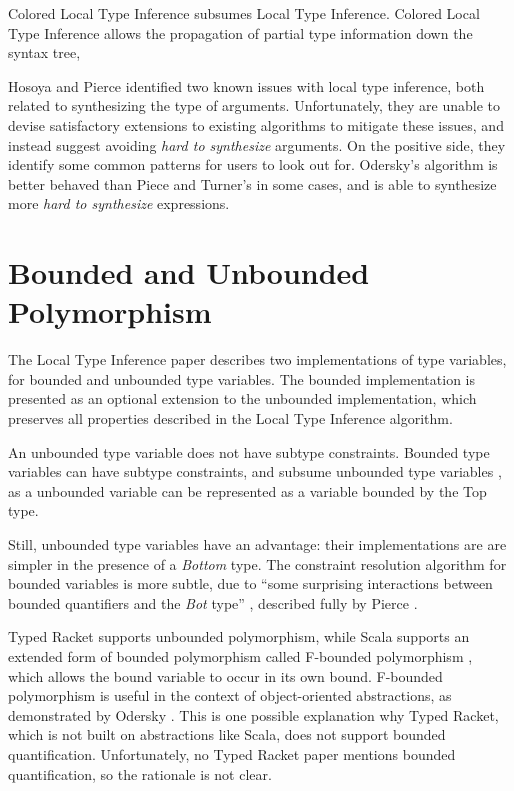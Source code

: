 \documentclass[12pt, a4paper]{article}
\begin{document}
Colored Local Type Inference subsumes Local Type Inference. Colored Local Type Inference
allows the propagation of partial type information down the syntax tree,

Hosoya and Pierce \cite{Hosoya99howgood} identified two known issues with
local type inference, both related to synthesizing the type of arguments.
Unfortunately, they are unable to devise satisfactory extensions to existing
algorithms to mitigate these issues, and instead suggest avoiding
\emph{hard to synthesize} arguments. On the positive side, they identify some
common patterns for users to look out for. Odersky's \cite{Odersky:2001:CLT:373243.360207} 
algorithm is better behaved
than Piece and Turner's \cite{Pierce:2000:LTI:345099.345100} in some cases,
and is able to synthesize more \emph{hard to synthesize} expressions.

\section{Bounded and Unbounded Polymorphism}

The Local Type Inference paper \cite{Pierce:2000:LTI:345099.345100}
describes two implementations of type variables, for bounded
and unbounded type variables. The bounded implementation is presented
as an optional extension  to the unbounded implementation, which preserves all
properties described in the Local Type Inference algorithm.

An unbounded type variable does not have subtype constraints.
Bounded type variables can have subtype constraints, and 
subsume unbounded type variables \cite{Pierce:2000:LTI:345099.345100}
, as a unbounded variable can be represented as a variable bounded
by the Top type.

Still, unbounded type variables have an advantage: their implementations are
are simpler in the presence of a \emph{Bottom} type. 
The constraint resolution algorithm for bounded variables
is more subtle, due to ``some surprising interactions between bounded quantifiers
and the \emph{Bot} type'' \cite{Pierce:2000:LTI:345099.345100}, described fully
by Pierce \cite{Pierce97boundedquantification}.

Typed Racket \cite{Tobin-Hochstadt:2008:DIT:1328897.1328486}
supports unbounded polymorphism, while Scala \cite{Odersky06anoverview}
supports an extended form of bounded polymorphism called
F-bounded polymorphism \cite{Canning:1989:FPO:99370.99392}, which allows the
bound variable to occur in its own bound.
F-bounded polymorphism is useful in the context of object-oriented abstractions,
as demonstrated by Odersky \cite{Odersky06anoverview} .
This is one possible explanation why Typed Racket, which is not built on abstractions like Scala,
does not support bounded quantification. Unfortunately, no Typed Racket paper mentions 
bounded quantification, so the rationale is not clear.
\end{document}
